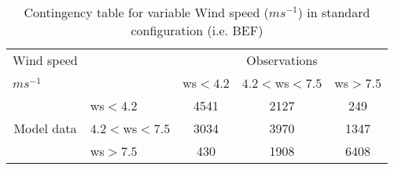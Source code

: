 
\begin{table}[]
\begin{center}
\begin{tabular}{llccc}
\hline
{Wind speed}                                       &                                                    & \multicolumn{3}{c}{Observations}                 \\
{$m s^{-1}$}                                       &                             & ws$<4.2$   & $4.2<$ws$<7.5$ & ws$>7.5$ \\
\hline
\multicolumn{1}{c}{\multirow{3}{*}{Model data}}  & ws$<4.2$          & 4541                & 2127                       & 249              \\
                                                 & $4.2<$ws$<7.5$ & 3034                & 3970                       & 1347              \\
                                                 & ws$>7.5$          & 430                & 1908                       & 6408              \\
\hline
\end{tabular}
\end{center}
\caption{Contingency table for variable Wind speed ($m s^{-1}$) in standard configuration (i.e. BEF)}
\label{tab:contingency}
\end{table}

